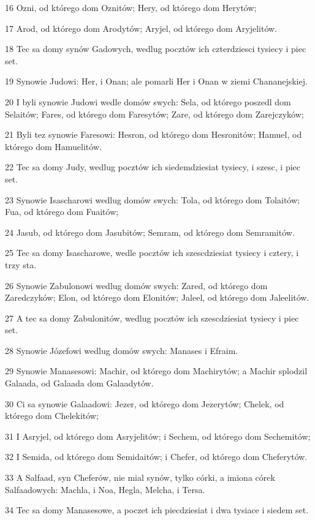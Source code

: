 \par 16 Ozni, od którego dom Oznitów; Hery, od którego dom Herytów;
\par 17 Arod, od którego dom Arodytów; Aryjel, od którego dom Aryjelitów.
\par 18 Tec sa domy synów Gadowych, wedlug pocztów ich czterdziesci tysiecy i piec set.
\par 19 Synowie Judowi: Her, i Onan; ale pomarli Her i Onan w ziemi Chananejskiej.
\par 20 I byli synowie Judowi wedle domów swych: Sela, od którego poszedl dom Selaitów; Fares, od którego dom Faresytów; Zare, od którego dom Zarejczyków;
\par 21 Byli tez synowie Faresowi: Hesron, od którego dom Hesronitów; Hamuel, od którego dom Hamuelitów.
\par 22 Tec sa domy Judy, wedlug pocztów ich siedemdziesiat tysiecy, i szesc, i piec set.
\par 23 Synowie Isascharowi wedlug domów swych: Tola, od którego dom Tolaitów; Fua, od którego dom Fuaitów;
\par 24 Jasub, od którego dom Jasubitów; Semram, od którego dom Semramitów.
\par 25 Tec sa domy Isascharowe, wedle pocztów ich szescdziesiat tysiecy i cztery, i trzy sta.
\par 26 Synowie Zabulonowi wedlug domów swych: Zared, od którego dom Zaredczyków; Elon, od którego dom Elonitów; Jaleel, od którego dom Jaleelitów.
\par 27 A tec sa domy Zabulonitów, wedlug pocztów ich szescdziesiat tysiecy i piec set.
\par 28 Synowie Józefowi wedlug domów swych: Manases i Efraim.
\par 29 Synowie Manasesowi: Machir, od którego dom Machirytów; a Machir splodzil Galaada, od Galaada dom Galaadytów.
\par 30 Ci sa synowie Galaadowi: Jezer, od którego dom Jezerytów; Chelek, od którego dom Chelekitów;
\par 31 I Asryjel, od którego dom Asryjelitów; i Sechem, od którego dom Sechemitów;
\par 32 I Semida, od którego dom Semidaitów; i Chefer, od którego dom Cheferytów.
\par 33 A Salfaad, syn Cheferów, nie mial synów, tylko córki, a imiona córek Salfaadowych: Machla, i Noa, Hegla, Melcha, i Tersa.
\par 34 Tec sa domy Manasesowe, a poczet ich piecdziesiat i dwa tysiace i siedem set.
